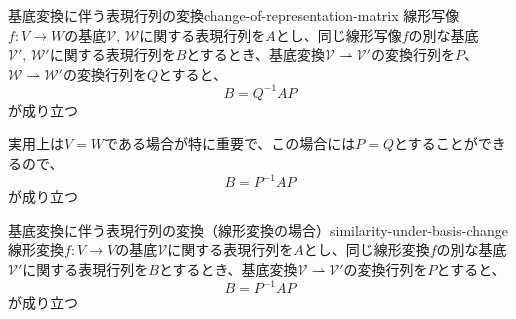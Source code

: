 \documentclass[../../../topic_linear-algebra]{subfiles}
\begin{document}
\begin{theorem}{基底変換に伴う表現行列の変換}{change-of-representation-matrix}
  線形写像$f\colon V \to W$の基底$\mathcal{V},\, \mathcal{W}$に関する表現行列を$A$とし、同じ線形写像$f$の別な基底$\mathcal{V}',\, \mathcal{W}'$に関する表現行列を$B$とするとき、基底変換$\mathcal{V} \rightharpoonup \mathcal{V}'$の変換行列を$P$、$\mathcal{W} \rightharpoonup \mathcal{W}'$の変換行列を$Q$とすると、
  \begin{equation*}
    B = Q^{-1} A P
  \end{equation*}
  が成り立つ
\end{theorem}

\sectionline

実用上は$V=W$である場合が特に重要で、この場合には$P=Q$とすることができるので、
\begin{equation*}
  B = P^{-1} A P
\end{equation*}
が成り立つ

\begin{theorem}{基底変換に伴う表現行列の変換（線形変換の場合）}{similarity-under-basis-change}
  線形変換$f\colon V \to V$の基底$\mathcal{V}$に関する表現行列を$A$とし、同じ線形変換$f$の別な基底$\mathcal{V}'$に関する表現行列を$B$とするとき、基底変換$\mathcal{V} \rightharpoonup \mathcal{V}'$の変換行列を$P$とすると、
  \begin{equation*}
    B = P^{-1} A P
  \end{equation*}
  が成り立つ
\end{theorem}
\end{document}
